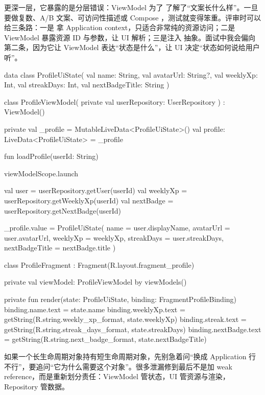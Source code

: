 更深一层，它暴露的是分层错误：ViewModel 为了  了解了“文案长什么样”。一旦要做复数、A/B 文案、可访问性描述或 Compose ，测试就变得笨重。评审时可以给三条路：一是  拿 Application context，只适合非常纯的资源访问；二是 ViewModel 暴露资源 ID 与参数，让 UI 解析；三是注入  抽象。面试中我会偏向第二条，因为它让 ViewModel 表达“状态是什么”，让 UI 决定“状态如何说给用户听”。

\begin{ktfix}
data class ProfileUiState(
    val name: String,
    val avatarUrl: String?,
    val weeklyXp: Int,
    val streakDays: Int,
    val nextBadgeTitle: String
)

class ProfileViewModel(
    private val userRepository: UserRepository
) : ViewModel() {
    private val _profile = MutableLiveData<ProfileUiState>()
    val profile: LiveData<ProfileUiState> = _profile

    fun loadProfile(userId: String) {
        viewModelScope.launch {
            val user = userRepository.getUser(userId)
            val weeklyXp = userRepository.getWeeklyXp(userId)
            val nextBadge = userRepository.getNextBadge(userId)

            _profile.value = ProfileUiState(
                name = user.displayName,
                avatarUrl = user.avatarUrl,
                weeklyXp = weeklyXp,
                streakDays = user.streakDays,
                nextBadgeTitle = nextBadge.title
            )
        }
    }
}

class ProfileFragment : Fragment(R.layout.fragment_profile) {
    private val viewModel: ProfileViewModel by viewModels()

    private fun render(state: ProfileUiState, binding: FragmentProfileBinding) {
        binding.name.text = state.name
        binding.weeklyXp.text = getString(R.string.weekly_xp_format, state.weeklyXp)
        binding.streak.text = getString(R.string.streak_days_format, state.streakDays)
        binding.nextBadge.text = getString(R.string.next_badge_format, state.nextBadgeTitle)
    }
}
\end{ktfix}

\begin{idea}[泄漏常常是分层问题的症状]
如果一个长生命周期对象持有短生命周期对象，先别急着问“换成 Application 行不行”，要追问“它为什么需要这个对象”。很多泄漏修到最后不是加 weak reference，而是重新划分责任：ViewModel 管状态，UI 管资源与渲染，Repository 管数据。
\end{idea}

